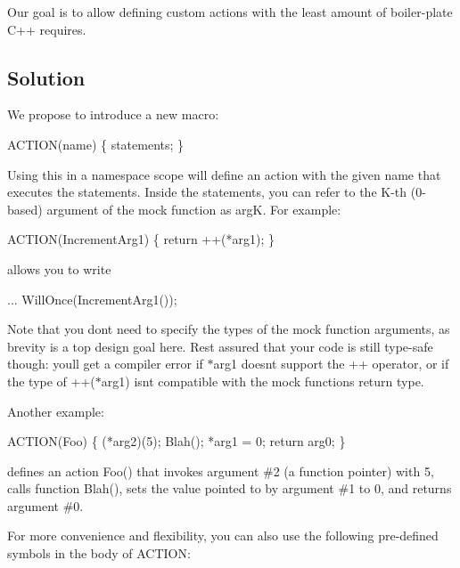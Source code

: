 Our goal is to allow defining custom actions with the least amount of boiler-\/plate C++ requires.

\subsection*{Solution}

We propose to introduce a new macro\+: 
\begin{DoxyCode}
ACTION(name) \{ statements; \}
\end{DoxyCode}


Using this in a namespace scope will define an action with the given name that executes the statements. Inside the statements, you can refer to the K-\/th (0-\/based) argument of the mock function as {\ttfamily argK}. For example\+: 
\begin{DoxyCode}
ACTION(IncrementArg1) \{ \textcolor{keywordflow}{return} ++(*arg1); \}
\end{DoxyCode}
 allows you to write 
\begin{DoxyCode}
... WillOnce(IncrementArg1());
\end{DoxyCode}


Note that you don\textquotesingle{}t need to specify the types of the mock function arguments, as brevity is a top design goal here. Rest assured that your code is still type-\/safe though\+: you\textquotesingle{}ll get a compiler error if {\ttfamily $\ast$arg1} doesn\textquotesingle{}t support the {\ttfamily ++} operator, or if the type of {\ttfamily ++($\ast$arg1)} isn\textquotesingle{}t compatible with the mock function\textquotesingle{}s return type.

Another example\+: 
\begin{DoxyCode}
ACTION(Foo) \{
  (*arg2)(5);
  Blah();
  *arg1 = 0;
  \textcolor{keywordflow}{return} arg0;
\}
\end{DoxyCode}
 defines an action {\ttfamily Foo()} that invokes argument \#2 (a function pointer) with 5, calls function {\ttfamily Blah()}, sets the value pointed to by argument \#1 to 0, and returns argument \#0.

For more convenience and flexibility, you can also use the following pre-\/defined symbols in the body of {\ttfamily A\+C\+T\+I\+ON}\+:

